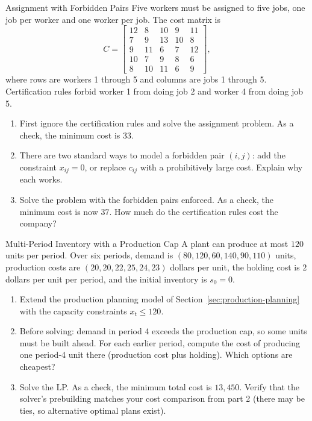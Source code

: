 \begin{ex}{Assignment with Forbidden Pairs}{}
\label{ex:assignment-forbidden}
 Five workers must be assigned to five jobs, one job per worker and one worker per job.  The cost matrix is
\[
C = \begin{bmatrix}
12 & 8 & 10 & 9 & 11 \\
7 & 9 & 13 & 10 & 8 \\
9 & 11 & 6 & 7 & 12 \\
10 & 7 & 9 & 8 & 6 \\
8 & 10 & 11 & 6 & 9
\end{bmatrix},
\]
where rows are workers 1 through 5 and columns are jobs 1 through 5.  Certification rules forbid worker 1 from doing job 2 and worker 4 from doing job 5.
\begin{enumerate}
\item First ignore the certification rules and solve the assignment problem.  As a check, the minimum cost is $33$.
\item There are two standard ways to model a forbidden pair $(i,j)$: add the constraint $x_{ij} = 0$, or replace $c_{ij}$ with a prohibitively large cost.  Explain why each works.
\item Solve the problem with the forbidden pairs enforced.  As a check, the minimum cost is now $37$.  How much do the certification rules cost the company?
\end{enumerate}
\end{ex}

\begin{ex}{Multi-Period Inventory with a Production Cap}{}
\label{ex:capacitated-production}
 A plant can produce at most $120$ units per period.  Over six periods, demand is $(80, 120, 60, 140, 90, 110)$ units, production costs are $(20, 20, 22, 25, 24, 23)$ dollars per unit, the holding cost is $2$ dollars per unit per period, and the initial inventory is $s_0 = 0$.
\begin{enumerate}
\item Extend the production planning model of Section~\ref{sec:production-planning} with the capacity constraints $x_t \leq 120$.
\item Before solving: demand in period 4 exceeds the production cap, so some units must be built ahead.  For each earlier period, compute the cost of producing one period-4 unit there (production cost plus holding).  Which options are cheapest?
\item Solve the LP.  As a check, the minimum total cost is $13{,}450$.  Verify that the solver's prebuilding matches your cost comparison from part 2 (there may be ties, so alternative optimal plans exist).
\end{enumerate}
\exrefs{\S\ref{sec:production-planning}}
\end{ex}

